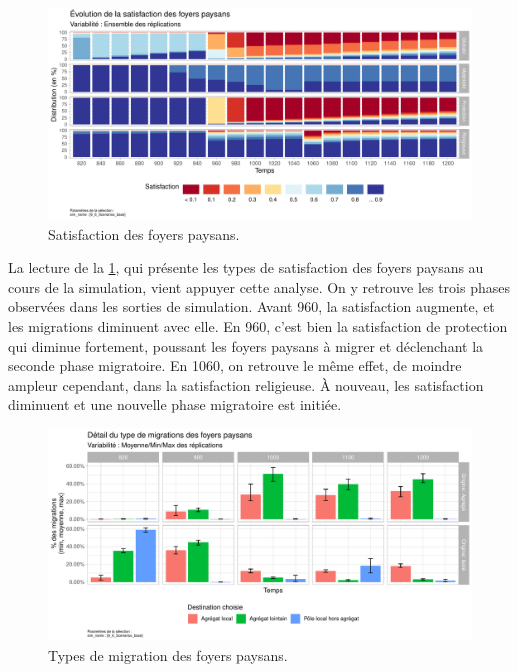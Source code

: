 \begin{figure}[H]
	\centering
	\includegraphics[width=\linewidth]{img/results_6_6/FP_Satisfaction_Haut.pdf}
	\caption{Satisfaction des foyers paysans.}
	\label{fig:results-fp-satisfaction}
\end{figure}

La lecture de la \cref{fig:results-fp-satisfaction}, qui présente les types de satisfaction des foyers paysans au cours de la simulation, vient appuyer cette analyse.
On y retrouve les trois phases observées dans les sorties de simulation.
Avant 960, la satisfaction augmente, et les migrations diminuent avec elle.
En 960, c'est bien la satisfaction de protection qui diminue fortement, poussant les foyers paysans à migrer et déclenchant la seconde phase migratoire.
En 1060, on retrouve le même effet, de moindre ampleur cependant, dans la satisfaction religieuse. À nouveau, les satisfaction diminuent et une nouvelle phase migratoire est initiée.

\begin{figure}[H]
	\centering
	\includegraphics[width=\linewidth]{img/results_6_6/FP_DeplacementsDetail_Haut.pdf}
	\caption{Types de migration des foyers paysans.}
	\label{fig:results-fp-migrations-detail}
\end{figure}

